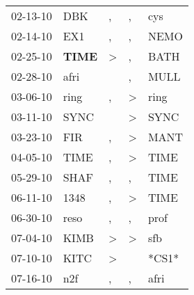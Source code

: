 \begin{supertabular}{p{0.07\textwidth}p{0.06\textwidth}p{0.02\textwidth}p{0.02\textwidth}p{0.06\textwidth}}
          02-13-10\textsuperscript{} &            DBK\textsuperscript{} &                , &                , &            cys\textsuperscript{} \\
          02-14-10\textsuperscript{} &            EX1\textsuperscript{} &                , &                , &           NEMO\textsuperscript{} \\
          02-25-10\textsuperscript{} &  \textbf{TIME\textsuperscript{}} &     \textgreater &                , &           BATH\textsuperscript{} \\
          02-28-10\textsuperscript{} &           afri\textsuperscript{} &                  &                , &           MULL\textsuperscript{} \\
          03-06-10\textsuperscript{} &           ring\textsuperscript{} &                , &     \textgreater &           ring\textsuperscript{} \\
          03-11-10\textsuperscript{} &           SYNC\textsuperscript{} &                  &     \textgreater &           SYNC\textsuperscript{} \\
          03-23-10\textsuperscript{} &            FIR\textsuperscript{} &                , &     \textgreater &           MANT\textsuperscript{} \\
          04-05-10\textsuperscript{} &           TIME\textsuperscript{} &                , &     \textgreater &           TIME\textsuperscript{} \\
          05-29-10\textsuperscript{} &           SHAF\textsuperscript{} &                , &                , &           TIME\textsuperscript{} \\
          06-11-10\textsuperscript{} &           1348\textsuperscript{} &                , &     \textgreater &           TIME\textsuperscript{} \\
          06-30-10\textsuperscript{} &           reso\textsuperscript{} &                , &                , &           prof\textsuperscript{} \\
          07-04-10\textsuperscript{} &           KIMB\textsuperscript{} &     \textgreater &     \textgreater &            sfb\textsuperscript{} \\
          07-10-10\textsuperscript{} &           KITC\textsuperscript{} &     \textgreater &                  &                            *CS1* \\
          07-16-10\textsuperscript{} &            n2f\textsuperscript{} &                , &                , &           afri\textsuperscript{} \\

\end{supertabular}
